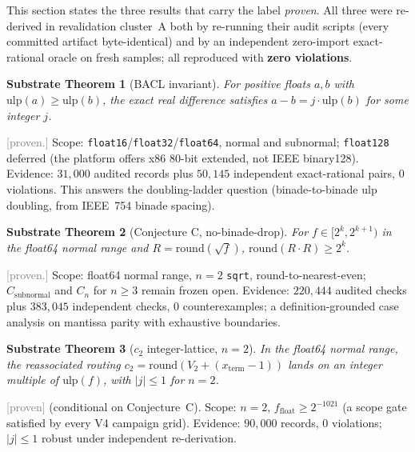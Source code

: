 \documentclass[11pt,a4paper]{article}
\newtheorem{substratethm}{Substrate Theorem}
\newcommand{\status}[1]{\textcolor{gray}{\small\textsf{[#1]}}}
\begin{document}
This section states the three results that carry the label \emph{proven}. All three were re-derived in revalidation cluster~A both by re-running their audit scripts (every committed artifact byte-identical) and by an independent zero-import exact-rational oracle on fresh samples; all reproduced with \textbf{zero violations}.

\begin{substratethm}[BACL invariant]\label{thm:bacl}
For positive floats $a,b$ with $\mathrm{ulp}(a)\ge\mathrm{ulp}(b)$, the exact real difference satisfies $a-b=j\cdot\mathrm{ulp}(b)$ for some integer $j$.
\end{substratethm}
\status{proven.} Scope: \texttt{float16}/\texttt{float32}/\texttt{float64}, normal and subnormal; \texttt{float128} deferred (the platform offers x86 80-bit extended, not IEEE binary128). Evidence: $31{,}000$ audited records plus $50{,}145$ independent exact-rational pairs, $0$ violations. This answers the doubling-ladder question (binade-to-binade ulp doubling, from IEEE~754 binade spacing).

\begin{substratethm}[Conjecture C, no-binade-drop]\label{thm:conjecture-c}
For $f\in[2^k,2^{k+1})$ in the float64 normal range and $R=\mathrm{round}(\sqrt f)$, $\mathrm{round}(R\cdot R)\ge 2^k$.
\end{substratethm}
\status{proven.} Scope: float64 normal range, $n{=}2$ \texttt{sqrt}, round-to-nearest-even; $C_{\text{subnormal}}$ and $C_n$ for $n\ge3$ remain frozen open. Evidence: $220{,}444$ audited checks plus $383{,}045$ independent checks, $0$ counterexamples; a definition-grounded case analysis on mantissa parity with exhaustive boundaries.

\begin{substratethm}[$c_2$ integer-lattice, $n{=}2$]\label{thm:c2}
In the float64 normal range, the reassociated routing $c_2=\mathrm{round}(V_2+(x_{\mathrm{term}}-1))$ lands on an integer multiple of $\mathrm{ulp}(f)$, with $|j|\le1$ for $n{=}2$.
\end{substratethm}
\status{proven} (conditional on Conjecture~C). Scope: $n{=}2$, $f_{\mathrm{float}}\ge2^{-1021}$ (a scope gate satisfied by every V4 campaign grid). Evidence: $90{,}000$ records, $0$ violations; $|j|\le1$ robust under independent re-derivation.
\end{document}
